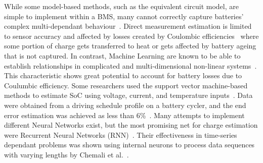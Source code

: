%
%
While some model-based methods, such as the equivalent circuit model, are simple to implement within a BMS, many cannot correctly capture batteries' complex multi-dependant behaviour~\cite{6953745}.
Direct measurement estimation is limited to sensor accuracy and affected by losses created by Coulombic efficiencies~\cite{Smith_2010} where some portion of charge gets transferred to heat or gets affected by battery ageing that is not captured.
%
In contrast, Machine Learning are known to be able to establish relationships in complicated and multi-dimensional non-linear systems~\cite{hansen_support_2005,anton_battery_2013,he_state_2014}.
This characteristic shows great potential to account for battery losses due to Coulumbic efficiency.
Some researchers used the support vector machine-based methods to estimate SoC using voltage, current, and temperature inputs~\cite{hansen_support_2005,anton_battery_2013}.
Data were obtained from a driving schedule profile on a battery cycler, and the end error estimation was achieved as less than 6\%~\cite{he_state_2014}.
Many attempts to implement different Neural Networks exist, but the most promising net for charge estimation were Recurrent Neural Networks (RNN)~\cite{song_lithium-ion_2018,Chemali2017,mamo_long_2020,jiao_gru-rnn_2020,xiao_accurate_2019,javid_adaptive_2020,zhang_deep_2020}.
Their effectiveness in time-series dependant problems was shown using internal neurons to process data sequences with varying lengths by Chemali et al.~\cite{Chemali2017}.

